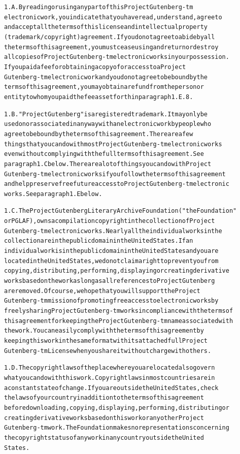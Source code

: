 \documentclass[12pt]{book}[2005/09/16]
\newenvironment{PGtext}{%
\begin{alltt}
\fontsize{8.1}{9}\ttfamily\selectfont}%
{\end{alltt}}
\begin{document}
\begin{PGtext}
1.A.  By reading or using any part of this Project Gutenberg-tm
electronic work, you indicate that you have read, understand, agree to
and accept all the terms of this license and intellectual property
(trademark/copyright) agreement.  If you do not agree to abide by all
the terms of this agreement, you must cease using and return or destroy
all copies of Project Gutenberg-tm electronic works in your possession.
If you paid a fee for obtaining a copy of or access to a Project
Gutenberg-tm electronic work and you do not agree to be bound by the
terms of this agreement, you may obtain a refund from the person or
entity to whom you paid the fee as set forth in paragraph 1.E.8.

1.B.  "Project Gutenberg" is a registered trademark.  It may only be
used on or associated in any way with an electronic work by people who
agree to be bound by the terms of this agreement.  There are a few
things that you can do with most Project Gutenberg-tm electronic works
even without complying with the full terms of this agreement.  See
paragraph 1.C below.  There are a lot of things you can do with Project
Gutenberg-tm electronic works if you follow the terms of this agreement
and help preserve free future access to Project Gutenberg-tm electronic
works.  See paragraph 1.E below.

1.C.  The Project Gutenberg Literary Archive Foundation ("the Foundation"
or PGLAF), owns a compilation copyright in the collection of Project
Gutenberg-tm electronic works.  Nearly all the individual works in the
collection are in the public domain in the United States.  If an
individual work is in the public domain in the United States and you are
located in the United States, we do not claim a right to prevent you from
copying, distributing, performing, displaying or creating derivative
works based on the work as long as all references to Project Gutenberg
are removed.  Of course, we hope that you will support the Project
Gutenberg-tm mission of promoting free access to electronic works by
freely sharing Project Gutenberg-tm works in compliance with the terms of
this agreement for keeping the Project Gutenberg-tm name associated with
the work.  You can easily comply with the terms of this agreement by
keeping this work in the same format with its attached full Project
Gutenberg-tm License when you share it without charge with others.

1.D.  The copyright laws of the place where you are located also govern
what you can do with this work.  Copyright laws in most countries are in
a constant state of change.  If you are outside the United States, check
the laws of your country in addition to the terms of this agreement
before downloading, copying, displaying, performing, distributing or
creating derivative works based on this work or any other Project
Gutenberg-tm work.  The Foundation makes no representations concerning
the copyright status of any work in any country outside the United
States.


\end{PGtext}
\end{document}
